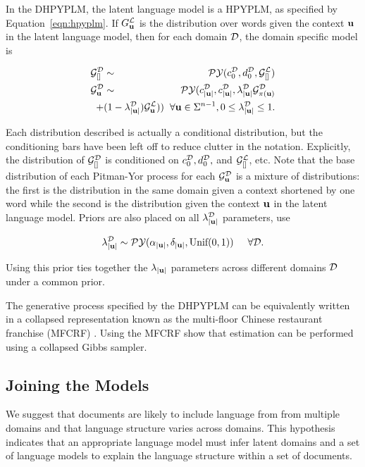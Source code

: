 In the DHPYPLM, the latent language model is a HPYPLM, as specified by Equation~\ref{eqn:hpyplm}.  If $G^\LA_\bu$ is the distribution over words given the context $\bu$ in the latent language model, then for each domain $\D$,  the domain specific model is

\begin{eqnarray}
\G^\D_{[]} &\sim& \PY(c^\D_0, d^\D_0,\G^\LA_{[]}) \nonumber \\
\G^\D_\bu &\sim& \PY(c^\D_{|\bu|}, c^\D_{|\bu|}, \lambda^\D_{|\bu|}\G^\D_{\pi(\bu)} \nonumber \\
&& \hspace{-1cm} + (1-\lambda^\D_{|\bu|})\G^\LA_\bu))  \hspace{.2cm} \forall \bu \in \Sigma^{n-1}, 0 \leq \lambda^\D_{|\bu|} \leq 1. \nonumber
\end{eqnarray}

Each distribution described is actually a conditional distribution, but the conditioning bars have been left off to reduce clutter in the notation.  Explicitly, the distribution of $\G^\D_{[]}$ is conditioned on $c^\D_0, d^\D_0,$ and $\G^\LA_{[]}$, etc.  Note that the base distribution of each Pitman-Yor process for each $\G^\D_\bu$ is a mixture of distributions: the first is the distribution in the same domain given a context shortened by one word while the second is the distribution given the context $\bu$ in the latent language model. Priors are also placed on all $\lambda^\D_{|\bu|}$ parameters, \cite{Wood2009a} use

$$\lambda^\D_{|\bu|} \sim \PY(\alpha_{|\bu|}, \delta_{|\bu|}, \textrm{Unif}(0,1))  \hspace{.5cm} \forall \D.$$

Using this prior ties together the $\lambda_{|\bu|}$ parameters across different domains $\D$ under a common prior.

The generative process specified by the  DHPYPLM can be equivalently written in a collapsed representation known as the multi-floor Chinese restaurant franchise (MFCRF) \cite{Wood2009a}.  Using the MFCRF \cite{Wood209a} show that estimation can be performed using a collapsed Gibbs sampler.

\subsection{Joining the Models}

We suggest that documents are likely to include language from from multiple domains and that language structure varies across domains. This hypothesis indicates that an appropriate language model must infer latent domains and a set of language models to explain the language structure within a set of documents.

